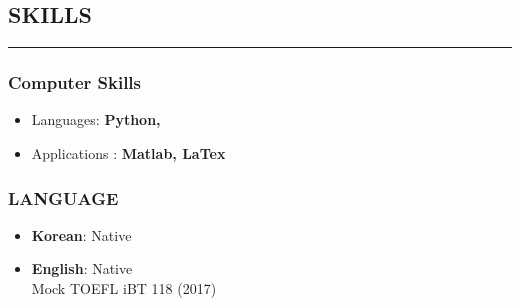 \documentclass[10pt,a4]{article}
\begin{document}
\begin{small}
\begin{itemize}
\end{itemize}







\lhead{\textcolor{gray}{\it Junghyun Lee}}
\fancyfoot[C]{}

\subsection*{SKILLS}
\hrule
\vspace{0.2cm}

\subsubsection*{Computer Skills}

\begin{itemize}
	\item Languages: \textbf{Python,
	}
	\item Applications : \textbf{Matlab,
	 LaTex}
\end{itemize}

\subsubsection*{LANGUAGE}

\begin{itemize}{}{}
	\item \textbf{Korean}: Native
	\item \textbf{English}: Native \\
	Mock TOEFL iBT 118 (2017)
	

\end{itemize}
\end{small}
\end{document}
